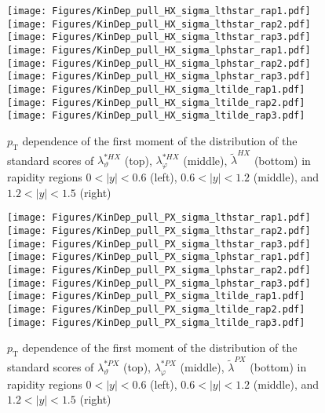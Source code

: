 \documentclass[12pt]{article}
\newcommand{\pT}{p_\mathrm{T}}
\newcommand{\absy}{\left |  y \right |}
\newcommand{\lamtildeHX}{\tilde{\lambda}^{\scriptscriptstyle HX}}
\newcommand{\lamthstarHX}{\lambda^{* \scriptscriptstyle HX}_\vartheta}
\newcommand{\lamphstarHX}{\lambda^{* \scriptscriptstyle HX}_\varphi}
\newcommand{\lamtildePX}{\tilde{\lambda}^{\scriptscriptstyle PX}}
\newcommand{\lamthstarPX}{\lambda^{* \scriptscriptstyle PX}_\vartheta}
\newcommand{\lamphstarPX}{\lambda^{* \scriptscriptstyle PX}_\varphi}
\begin{document}
\begin{figure}[htbp]
\centering
\texttt{[image: Figures/KinDep\_pull\_HX\_sigma\_lthstar\_rap1.pdf]}
\texttt{[image: Figures/KinDep\_pull\_HX\_sigma\_lthstar\_rap2.pdf]}
\texttt{[image: Figures/KinDep\_pull\_HX\_sigma\_lthstar\_rap3.pdf]}
\texttt{[image: Figures/KinDep\_pull\_HX\_sigma\_lphstar\_rap1.pdf]}
\texttt{[image: Figures/KinDep\_pull\_HX\_sigma\_lphstar\_rap2.pdf]}
\texttt{[image: Figures/KinDep\_pull\_HX\_sigma\_lphstar\_rap3.pdf]}
\texttt{[image: Figures/KinDep\_pull\_HX\_sigma\_ltilde\_rap1.pdf]}
\texttt{[image: Figures/KinDep\_pull\_HX\_sigma\_ltilde\_rap2.pdf]}
\texttt{[image: Figures/KinDep\_pull\_HX\_sigma\_ltilde\_rap3.pdf]}
\caption{$\pT$ dependence of the first moment of the distribution of the
standard scores of $\lamthstarHX$ (top), $\lamphstarHX$ (middle), $\lamtildeHX$ (bottom) in rapidity
regions $0<\absy<0.6$ (left), $0.6<\absy<1.2$ (middle), and $1.2<\absy<1.5$ (right)}
\end{figure}
\clearpage


\begin{figure}[htbp]
\centering
\texttt{[image: Figures/KinDep\_pull\_PX\_sigma\_lthstar\_rap1.pdf]}
\texttt{[image: Figures/KinDep\_pull\_PX\_sigma\_lthstar\_rap2.pdf]}
\texttt{[image: Figures/KinDep\_pull\_PX\_sigma\_lthstar\_rap3.pdf]}
\texttt{[image: Figures/KinDep\_pull\_PX\_sigma\_lphstar\_rap1.pdf]}
\texttt{[image: Figures/KinDep\_pull\_PX\_sigma\_lphstar\_rap2.pdf]}
\texttt{[image: Figures/KinDep\_pull\_PX\_sigma\_lphstar\_rap3.pdf]}
\texttt{[image: Figures/KinDep\_pull\_PX\_sigma\_ltilde\_rap1.pdf]}
\texttt{[image: Figures/KinDep\_pull\_PX\_sigma\_ltilde\_rap2.pdf]}
\texttt{[image: Figures/KinDep\_pull\_PX\_sigma\_ltilde\_rap3.pdf]}
\caption{$\pT$ dependence of the first moment of the distribution of the
standard scores of $\lamthstarPX$ (top), $\lamphstarPX$ (middle), $\lamtildePX$ (bottom) in rapidity
regions $0<\absy<0.6$ (left), $0.6<\absy<1.2$ (middle), and $1.2<\absy<1.5$ (right)}
\end{figure}
\clearpage
\end{document}
